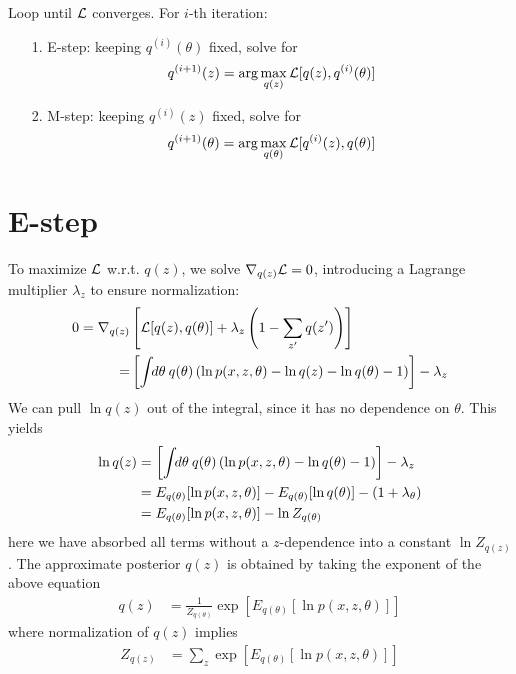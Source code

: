 Loop until $\mathcal{L}$ converges. For $i$-th iteration:
\begin{itemize}
 \item[1.] E-step: keeping $q^{(i)}(\theta)$ fixed, solve for
   \[
     q^{(i+1)}(z) = \arg\max_{q(z)} \mathcal{L}[q(z), q^{(i)}(\theta)]
   \]
   
 \item[2.] M-step: keeping $q^{(i)}(z)$ fixed, solve for  
   \[
     q^{(i+1)}(\theta) = \arg\max_{q(\theta)} \mathcal{L}[q^{(i)}(z), q(\theta)]
   \]
   
\end{itemize}


\section{E-step}

To maximize $\mathcal{L}$ w.r.t. $q(z)$, we solve $\nabla_{q(z)} \mathcal{L} = 0$, introducing a Lagrange multiplier $\lambda_z$ to ensure normalization:
\begin{align}
  \begin{split}
  0 = \nabla_{q(z)} &
  \left[ 
    \mathcal{L}[q(z), q(\theta)] 
    + \lambda_z \left( 1 - \sum_{z'} q(z') \right)
  \right] \\
  = &
  \left[
  \int \!\!d\theta \: 
  q(\theta)
  \left(
  \ln p(x, z, \theta)
  - \ln q(z) 
  - \ln q(\theta)
  - 1
  \right)
  \right]
  - \lambda_z
  \end{split}
\end{align}
We can pull $\ln q(z)$ out of the integral, since it has no dependence on $\theta$. This yields
\begin{align}
  \begin{split}
  \ln q(z) 
  &=
    \left[
    \int \!\!d\theta \:  
    q(\theta)
    \left(
    \ln p(x, z, \theta)
    - \ln q(\theta) 
    - 1
    \right)
    \right]
    - \lambda_z \\
  &=
    E_{q(\theta)} [ \ln p(x, z, \theta) ] -  
    E_{q(\theta)} [ \ln q(\theta) ] - (1 + \lambda_{\theta})\\
  &=
    E_{q(\theta)} [ \ln p(x, z, \theta) ] -  
    \ln Z_{q(\theta)}
  \end{split}
\end{align}
here we have absorbed all terms without a $z$-dependence into a constant $\ln Z_{q(z)}$. The approximate posterior $q(z)$ is obtained by taking the exponent of the above equation
\begin{align}
  q(z) &= \frac{1}{Z_{q(\theta)}} 
            \exp \left[ E_{q(\theta)} [ \ln p(x, z, \theta) ] \right]
\end{align}
where normalization of $q(z)$ implies
\begin{align}
  Z_{q(z)}
  &= \sum_{z} \exp \left[ E_{q(\theta)} [ \ln p(x, z, \theta) ] \right]
\end{align}

